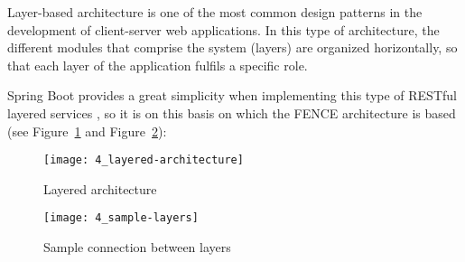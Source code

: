 Layer-based architecture \cite{layered_architecture} is one of the most common design patterns in the development of client-server web applications. In this type of architecture, the different modules that comprise the system (layers) are organized horizontally, so that each layer of the application fulfils a specific role.

Spring Boot \cite{spring_boot} provides a great simplicity when implementing this type of RESTful layered services \cite{api_rest},  so it is on this basis on which the FENCE architecture is based (see Figure~\ref{fig:layer_arch} and Figure~\ref{fig:layers-sample}):

\begin{figure}
	\centering
	\texttt{[image: 4\_layered-architecture]}
	\caption[Layered architecture]{Layered architecture}
	\label{fig:layer_arch}
\end{figure}

\begin{figure}
	\centering
	\texttt{[image: 4\_sample-layers]}
	\caption[Sample connection between layers]{Sample connection between layers}
	\label{fig:layers-sample}
\end{figure}

